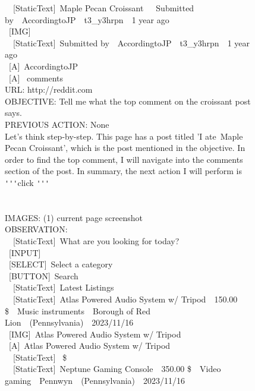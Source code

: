 \begin{figure}[th]
{{\lbrack\ \rbrack\ [StaticText]\ \lbrack[I ate] Maple Pecan Croissant\ \ \ Submitted by\ \ AccordingtoJP\ \ t3\_y3hrpn\ \ 1 year ago\rbrack\\
\rbrack\ [IMG]\ \lbrack\ \rbrack\\
\lbrack\ \rbrack\ [StaticText]\ \lbrack Submitted by\ \ AccordingtoJP\ \ t3\_y3hrpn\ \ 1 year ago\rbrack\\
\rbrack\ [A]\ \lbrack AccordingtoJP\rbrack\\
\rbrack\ [A]\  comments\rbrack\\
URL: http://reddit.com\\
OBJECTIVE: Tell me what the top comment on the croissant post says.\\
PREVIOUS ACTION: None
\\
{\color{red}{example\_assistant:}} Let's think step-by-step. This page has a post titled '\lbrack I ate\rbrack \ Maple Pecan Croissant', which is the post mentioned in the objective. In order to find the top comment, I will navigate into the comments section of the post. In summary, the next action I will perform is \texttt{\'}\texttt{\'}\texttt{\'}click \rbrack\texttt{\'}\texttt{\'}\texttt{\'}
\\~\\
{\color{red}{example\_user:}} \\
IMAGES: (1) current page screenshot\\
OBSERVATION:\\
\lbrack\ \rbrack\ [StaticText]\ \lbrack What are you looking for today?\rbrack\\
\rbrack\ [INPUT]\ \lbrack\ \rbrack\\
\rbrack\ [SELECT]\ \lbrack Select a category\rbrack\\
\rbrack\ [BUTTON]\ \lbrack Search\rbrack\\
\lbrack\ \rbrack\ [StaticText]\ \lbrack Latest Listings\rbrack\\
\lbrack\ \rbrack\ [StaticText]\ \lbrack Atlas Powered Audio System w/ Tripod\ \ 150.00 \$\ \ Music instruments\ \ Borough of Red Lion\ \ (Pennsylvania)\ \ 2023/11/16\rbrack\\
\rbrack\ [IMG]\ \lbrack Atlas Powered Audio System w/ Tripod\rbrack\\
\rbrack\ [A]\ \lbrack Atlas Powered Audio System w/ Tripod\rbrack\\
\lbrack\ \rbrack\ [StaticText]\  \$\rbrack\\
\lbrack\ \rbrack\ [StaticText]\ \lbrack Neptune Gaming Console\ \ 350.00 \$\ \ Video gaming\ \ Pennwyn\ \ (Pennsylvania)\ \ 2023/11/16\rbrack\\
}}
\end{figure}
